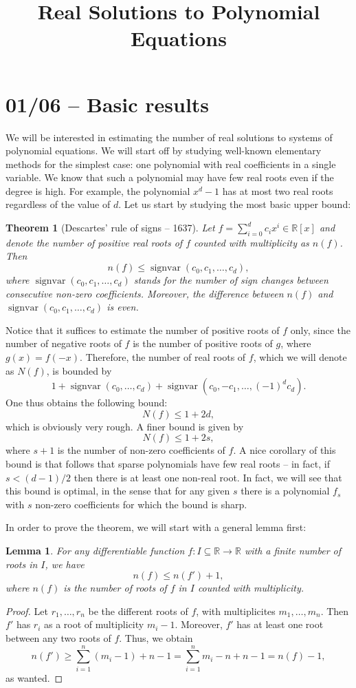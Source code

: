 \documentclass[11pt, a4paper]{article}
\title{Real Solutions to Polynomial Equations}
\date{}
\newcommand{\RR}{\mathbb{R}}
\DeclareMathOperator{\sv}{signvar}
\theoremstyle{plain}
\newtheorem{lemma}[prop]{Lemma}
\newtheorem{thm}[prop]{Theorem}
\theoremstyle{definition}
\begin{document}
\maketitle{}

\section{01/06 -- Basic results}
We will be interested in estimating the number of real solutions to systems of polynomial equations. We will start off by studying well-known elementary methods for the simplest case: one polynomial with real coefficients in a single variable. We know that such a polynomial may have few real roots even if the degree is high. For example, the polynomial $x^d-1$ has at most two real roots regardless of the value of $d$. Let us start by studying the most basic upper bound:

\begin{thm}[Descartes' rule of signs -- 1637] Let $f=\sum_{i=0}^d c_i x^i\in \RR[x]$ and denote the number of positive real roots of $f$ counted with multiplicity as $n(f)$. Then 
\[n(f)\leq \sv(c_0,c_1,\dots,c_d),\]
where $\sv(c_0,c_1,\dots,c_d)$ stands for the number of sign changes between consecutive non-zero coefficients. Moreover, the difference between $n(f)$ and $\sv(c_0,c_1,\dots,c_d)$ is even.
\end{thm}

Notice that it suffices to estimate the number of positive roots of $f$ only, since the number of negative roots of $f$ is the number of positive roots of $g$, where $g(x)=f(-x)$. Therefore, the number of real roots of $f$, which we will denote as $N(f)$, is bounded by
\[1+\sv(c_0,\dots,c_d)+\sv(c_0,-c_1,\dots,(-1)^dc_d).\]
One thus obtains the following bound:
\[N(f)\leq 1+2d,\]
which is obviously very rough. A finer bound is given by
\[N(f)\leq 1+2s,\]
where $s+1$ is the number of non-zero coefficients of $f$. A nice corollary of this bound is that follows that sparse polynomials have few real roots -- in fact, if $s<(d-1)/2$ then there is at least one non-real root. In fact, we will see that this bound is optimal, in the sense that for any given $s$ there is a polynomial $f_s$ with $s$ non-zero coefficients for which the bound is sharp.

In order to prove the theorem, we will start with a general lemma first:

\begin{lemma} For any differentiable function $f:I\subseteq \RR\to\RR$ with a finite number of roots in $I$, we have
\[n(f) \leq n(f')+1,\]
where $n(f)$ is the number of roots of $f$ in $I$ counted with multiplicity.
\end{lemma}
\begin{proof} Let $r_1,\dots,r_n$ be the different roots of $f$, with multiplicites $m_1,\dots, m_n$. Then $f'$ has $r_i$ as a root of multiplicity $m_i -1$. Moreover, $f'$ has at least one root between any two roots of $f$. Thus, we obtain
\[n(f')\geq \sum_{i=1}^n (m_i-1)+n-1 = \sum_{i=1}^n m_i-n +n-1 = n(f)-1,\]
as wanted.
\end{proof}
\end{document}
